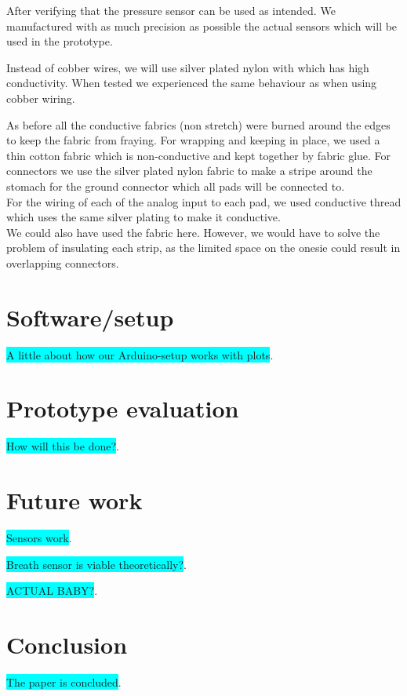 \documentclass{sigchi-ext}
\begin{document}
After verifying that the pressure sensor can be used as
intended. We manufactured with as much precision as possible
the actual sensors which will be used in the prototype.

Instead of cobber wires, we will use silver plated nylon
with which has high conductivity. When tested we experienced
the same behaviour as when using cobber wiring.

As before all the conductive fabrics (non stretch) were
burned around the edges to keep the fabric from fraying.
For wrapping and keeping in place, we used a thin cotton
fabric which is non-conductive and kept together by
fabric glue.
For connectors we use the silver plated nylon fabric to make a stripe around
the stomach for the ground connector which all pads will be connected to.\\
For the wiring of each of the analog input to each pad, we used conductive thread
which uses the same silver plating to make it conductive.\\
We could also have used the fabric here. However, we would have to solve the problem
of insulating each strip, as the limited space on the onesie could result in overlapping
connectors.

\clearpage

\section{Software/setup}
\colorbox{cyan}{A little about how our Arduino-setup works with plots}.

\section{Prototype evaluation}
\colorbox{cyan}{How will this be done?}.

\section{Future work}
\colorbox{cyan}{Sensors work}.

\colorbox{cyan}{Breath sensor is viable theoretically?}.

\colorbox{cyan}{ACTUAL BABY?}.

\section{Conclusion}
\colorbox{cyan}{The paper is concluded}.




\balance{}



\end{document}
